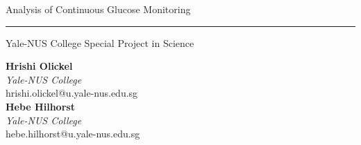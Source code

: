 %
\begin{titlepage}
	\flushright
	\hfill
	\vfill
	{\LARGE Analysis of Continuous Glucose Monitoring \par}
	\rule[5pt]{\textwidth}{.4pt} \par
	{\Large Yale-NUS College Special Project in Science}
	\vfill
    
    \flushleft
    {
    \small
    \textbf{Hrishi Olickel} \\
    \textit{Yale-NUS College} \\
    hrishi.olickel@u.yale-nus.edu.sg \\[1.5em]
    \textbf{Hebe Hilhorst} \\
    \textit{Yale-NUS College} \\
    hebe.hilhorst@u.yale-nus.edu.sg \\[1.5em]    
    }
\end{titlepage} 